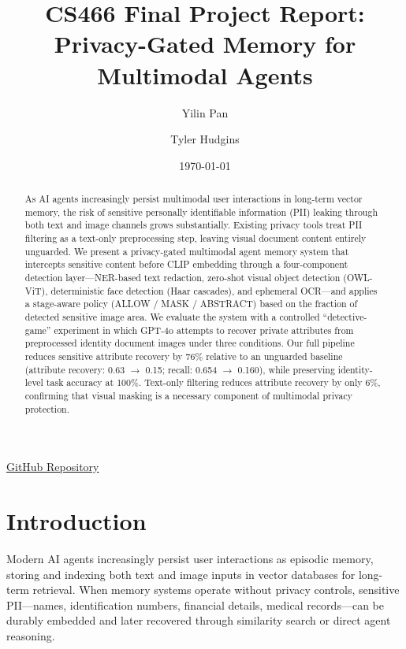 \documentclass[11pt]{article}
\title{CS466 Final Project Report:\\Privacy-Gated Memory for Multimodal Agents}
\author{Yilin Pan \and Tyler Hudgins}
\date{\today}
\begin{document}
\maketitle
\begin{center}
    \href{https://github.com/Athelas011/pii-project}{GitHub Repository}
\end{center}

\begin{abstract}
As AI agents increasingly persist multimodal user interactions in long-term vector memory, the risk of sensitive personally identifiable information (PII) leaking through both text and image channels grows substantially. Existing privacy tools treat PII filtering as a text-only preprocessing step, leaving visual document content entirely unguarded. We present a privacy-gated multimodal agent memory system that intercepts sensitive content before CLIP embedding through a four-component detection layer---NER-based text redaction, zero-shot visual object detection (OWL-ViT), deterministic face detection (Haar cascades), and ephemeral OCR---and applies a stage-aware policy (ALLOW / MASK / ABSTRACT) based on the fraction of detected sensitive image area. We evaluate the system with a controlled ``detective-game'' experiment in which GPT-4o attempts to recover private attributes from preprocessed identity document images under three conditions. Our full pipeline reduces sensitive attribute recovery by 76\% relative to an unguarded baseline (attribute recovery: 0.63 $\to$ 0.15; recall: 0.654 $\to$ 0.160), while preserving identity-level task accuracy at 100\%. Text-only filtering reduces attribute recovery by only 6\%, confirming that visual masking is a necessary component of multimodal privacy protection.
\end{abstract}

\section{Introduction}

Modern AI agents increasingly persist user interactions as episodic memory, storing and indexing both text and image inputs in vector databases for long-term retrieval. When memory systems operate without privacy controls, sensitive PII---names, identification numbers, financial details, medical records---can be durably embedded and later recovered through similarity search or direct agent reasoning.
\end{document}
